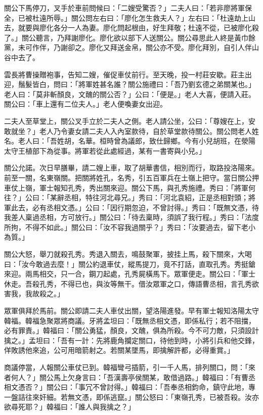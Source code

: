 關公下馬停刀，叉手於車前問候曰：「二嫂受驚否？」二夫人曰：「若非廖將軍保全，已被杜遠所辱。」關公問左右曰：「廖化怎生救夫人？」左右曰：「杜遠劫上山去，就要與廖化各分一人為妻。廖化問起根由，好生拜敬；杜遠不從，已被廖化殺了。」關公聽言，乃拜謝廖化。廖化欲以部下人送關公。關公尋思此人終是黃巾餘黨，未可作伴，乃謝卻之。廖化又拜送金帛，關公亦不受。廖化拜別，自引人伴山谷中去了。

雲長將曹操贈袍事，告知二嫂，催促車仗前行。至天晚，投一村莊安歇。莊主出迎，鬚髮皆白，問曰：「將軍姓甚名誰？關公施禮曰：「吾乃劉玄德之弟關某也。」老人曰：「莫非斬顏良，文醜的關公否？」公曰：「便是。」老人大喜，便請入莊。關公曰：「車上還有二位夫人。」老人便喚妻女出迎。

二夫人至草堂上，關公叉手立於二夫人之側。老人請公坐，公曰：「尊嫂在上，安敢就坐？」老人乃令妻女請二夫人入內室款待，自於草堂款待關公。關公問老人姓名。老人曰：「吾姓胡，名華。桓時曾為議郎，致仕歸鄉。今有小兒胡班，在滎陽太守王植部下為從事。將軍若從此處經過，某有一書寄與小兒。」

關公允諾。次日早膳畢，請二嫂上車，取了胡華書信，相別而行，取路投洛陽來。前至一關，名東嶺關。把關將姓孔，名秀，引五百軍兵在土嶺上把守。當日關公押車仗上嶺，軍士報知孔秀，秀出關來迎。關公下馬，與孔秀施禮。秀曰：「將軍何往？」公曰：「某辭丞相，特往河北尋兄。」秀曰：「河北袁紹，正是丞相對頭；將軍此去，必有丞相文憑。」公曰：「因行期忽迫，不曾討得。」秀曰：「既無文憑，待我差人稟過丞相，方可放行。」關公曰：「待去稟時，須誤了我行程。」秀曰：「法度所拘，不得不如此。」關公曰：「汝不容我過關乎？」秀曰：「汝要過去，留下老小為質。」

關公大怒，舉刀就殺孔秀。秀退入關去，鳴鼓聚軍，披挂上馬，殺下關來，大喝曰：「汝今敢過去麼！」關公約退車仗，縱馬提刀，竟不打話，直取孔秀。秀挺鎗來迎。兩馬相交，只一合，鋼刀起處，孔秀屍橫馬下。眾軍便走。關公曰：「軍士休走。吾殺孔秀，不得已也，與汝等無干。借汝眾軍之口，傳語曹丞相，言孔秀欲害我，我故殺之。」

眾軍俱拜於馬前。關公即請二夫人車仗出關，望洛陽進發。早有軍士報知洛陽太守韓福。韓福急聚眾將商議。牙將孟坦曰：「既無丞相文憑，即係私行；若不阻擋，必有罪責。」韓福曰：「關公勇猛，顏良，文醜，俱為所殺。今不可力敵，只須設計擒之。」孟坦曰：「吾有一計：先將鹿角攔定關口，待他到時，小將引兵和他交鋒，佯敗誘他來追，公可用暗箭射之。若關某墜馬，即擒解許都，必得重賞。」

商議停當，人報關公車仗已到。韓福彎弓插箭，引一千人馬，排列關口，問：「來者何人？」關公馬上欠身言曰：「吾漢壽亭侯關某，敢借過路。」韓福曰：「有曹丞相文憑否？」關公曰：「事冗不曾討得。」韓福曰：「吾奉丞相鈞命，鎮守此地，專一盤詰往來奸細。若無文憑，即係逃竄。」關公怒曰：「東嶺孔秀，已被吾殺。汝亦欲尋死耶？」韓福曰：「誰人與我擒之？」

